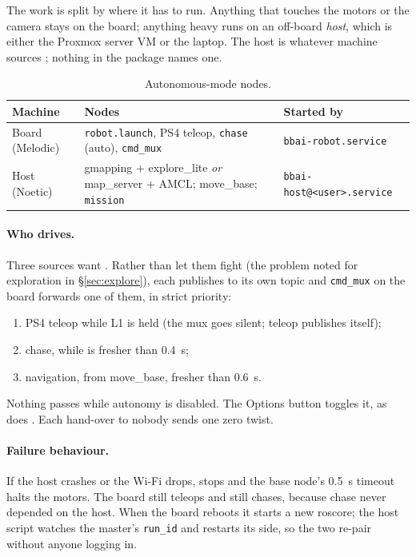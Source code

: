 The work is split by where it has to run. Anything that touches the motors or
the camera stays on the board; anything heavy runs on an off-board
\emph{host}, which is either the Proxmox server VM or the laptop. The host is
whatever machine sources ; nothing in
the package names one.

\begin{table}[ht]
\centering\small
\caption{Autonomous-mode nodes.}
\label{tab:autonodes}
\begin{tabularx}{\linewidth}{@{}lXl@{}}
\toprule
Machine & Nodes & Started by \\
\midrule
Board (Melodic) & \texttt{robot.launch}, PS4 teleop, \texttt{chase} (auto),
  \texttt{cmd\_mux} & \texttt{bbai-robot.service} \\
Host (Noetic) & gmapping + explore\_lite \emph{or} map\_server + AMCL;
  move\_base; \texttt{mission} & \texttt{bbai-host@<user>.service} \\
\bottomrule
\end{tabularx}
\end{table}

\paragraph{Who drives.} Three sources want . Rather than let
them fight (the problem noted for exploration in \S\ref{sec:explore}), each
publishes to its own topic and \texttt{cmd\_mux} on the board forwards one of
them, in strict priority:
\begin{enumerate}[nosep]
\item PS4 teleop while L1 is held (the mux goes silent; teleop publishes
   itself);
\item chase, while  is fresher than \SI{0.4}{s};
\item navigation,  from move\_base, fresher than
  \SI{0.6}{s}.
\end{enumerate}
Nothing passes while autonomy is disabled. The Options button toggles it,
as does . Each hand-over to nobody sends one zero
twist.

\paragraph{Failure behaviour.} If the host crashes or the Wi-Fi drops,
 stops and the base node's \SI{0.5}{s} timeout halts the
motors. The board still teleops and still chases, because chase never depended
on the host. When the board reboots it starts a new roscore; the host script
watches the master's \texttt{run\_id} and restarts its side, so the two
re-pair without anyone logging in.

